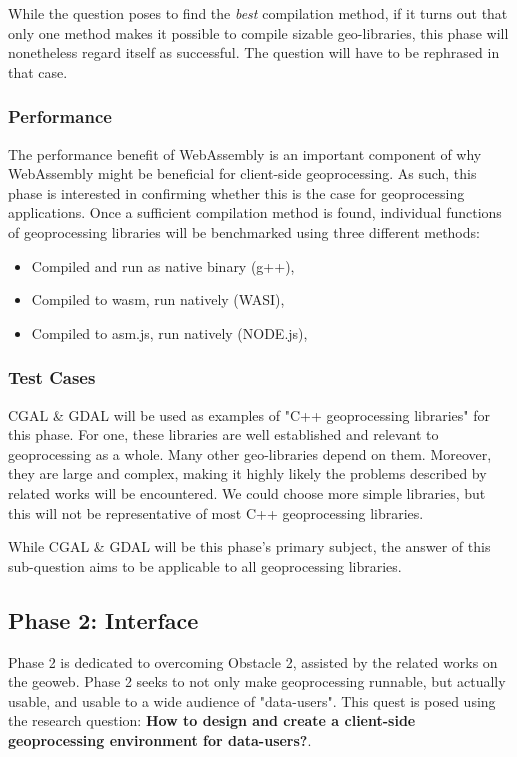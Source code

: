 While the question poses to find the \textit{best} compilation method, if it turns out that only one method makes it possible to compile sizable geo-libraries, this phase will nonetheless regard itself as successful. The question will have to be rephrased in that case. 

\subsubsection*{Performance}
The performance benefit of WebAssembly is an important component of why WebAssembly might be beneficial for client-side geoprocessing. As such, this phase is interested in confirming whether this is the case for geoprocessing applications. Once a sufficient compilation method is found, individual functions of geoprocessing libraries will be benchmarked using three different methods: 

\begin{itemize}
    \item Compiled and run as native binary (g++), 
    \item Compiled to wasm, run natively (WASI),
    \item Compiled to asm.js, run natively (NODE.js),
\end{itemize}

\subsubsection*{Test Cases}
CGAL \& GDAL will be used as examples of "C++ geoprocessing libraries" for this phase. For one, these libraries are well established and relevant to geoprocessing as a whole. Many other geo-libraries depend on them. Moreover, they are large and complex, making it highly likely the problems described by related works will be encountered. We could choose more simple libraries, but this will not be representative of most C++ geoprocessing libraries. 

While CGAL \& GDAL will be this phase's primary subject, the answer of this sub-question aims to be applicable to all geoprocessing libraries. 

\newpage
\subsection{Phase 2: Interface}

Phase 2 is dedicated to overcoming Obstacle 2, assisted by the related works on the geoweb. Phase 2 seeks to not only make geoprocessing runnable, but actually usable, and usable to a wide audience of "data-users". This quest is posed using the research question: \textbf{How to design and create a client-side geoprocessing environment for data-users?}. 

